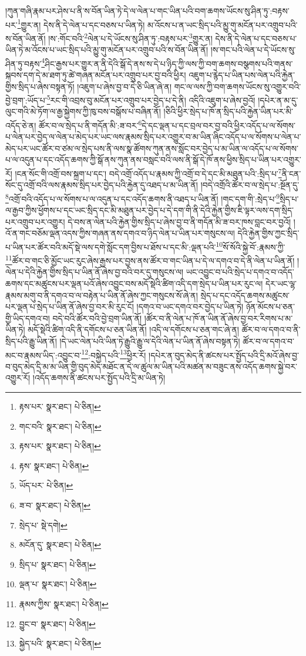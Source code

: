 །ཀུན་གཞི་རྣམ་པར་ཤེས་པ་ནི་ས་བོན་ཡིན་ཏེ་དེ་ལ་ལེན་པ་གང་ཡིན་པའི་བག་ཆགས་ཡོངས་སུ་ཤིན་ཏུ་:བརྟས་པར་\footnote{རྟས་པར་  སྣར་ཐང་།  པེ་ཅིན། }གྱུར་ན། དེས་ནི་དེ་ལེན་པ་དང་བཅས་པ་ཡིན་ཏེ། མ་འོངས་པ་ན་ཡང་སྲིད་པའི་མྱུ་གུ་མངོན་པར་འགྲུབ་པའི་ས་བོན་ཡིན་ནོ། །ས་:གོང་བའི་\footnote{གང་བའི་  སྣར་ཐང་།  པེ་ཅིན། }ལེན་པ་དེ་ཡོངས་སུ་ཤིན་ཏུ་:བརྟས་པར་\footnote{རྟས་པར་  སྣར་ཐང་།  པེ་ཅིན། }གྱུར་ན། དེས་ནི་དེ་ལེན་པ་དང་བཅས་པ་ཡིན་ཏེ་མ་འོངས་པ་ཡང་སྲིད་པའི་མྱུ་གུ་མངོན་པར་འགྲུབ་པའི་ས་བོན་ཡིན་ནོ། །ས་གང་པའི་ལེན་པ་དེ་ཡོངས་སུ་ཤིན་ཏུ་བརྟས་\footnote{རྟས་  སྣར་ཐང་།  པེ་ཅིན། }ཤིང་རྒྱས་པར་གྱུར་ན་ནི་དེའི་སྒོ་དེ་ནས་ས་དེ་པ་ཉིད་ཀྱི་ལས་ཀྱི་བག་ཆགས་བསྩགས་པའི་གནས་སྐབས་དག་དེ་མ་ཐག་ཏུ་ཚེ་གཞན་མངོན་པར་འགྲུབ་པར་བྱ་བའི་ཕྱིར། འཇུག་པ་རྙེད་པ་ཡིན་པས་ལེན་པའི་རྐྱེན་གྱིས་སྲིད་པ་ཞེས་བསྟན་ཏོ། །འཇུག་པ་ཞེས་བྱ་བ་དེ་ཅི་ཡིན་ཞེ་ན། གང་ལ་ལས་ཀྱི་བག་ཆགས་ཡོངས་སུ་འགྱུར་བའི་བྱེ་བྲག་:ཡོད་པ་\footnote{ཡོད་པར་  པེ་ཅིན། }རང་གི་འབྲས་བུ་མངོན་པར་འགྲུབ་པར་བྱེད་པ་དེ་ནི། འདིའི་འཇུག་པ་ཞེས་བྱའོ། །དཔེར་ན་མ་དུ་ལུང་གའི་མེ་ཏོག་ལ་རྒྱ་སྐྱེགས་ཀྱི་ཁུ་བས་བསྒོས་པ་བཞིན་ནོ། །ཅིའི་ཕྱིར་སྲེད་པ་ཁོ་ན་སྲིད་པའི་རྐྱེན་ཡིན་པར་མི་འདོད་ཅེ་ན། ཚོར་བ་ལ་སྲེད་པ་ནི་གདོན་མི་:ཟ་བར་\footnote{ཟ་བ་  སྣར་ཐང་།  པེ་ཅིན། }དེ་དང་ལྡན་པ་དང་བྲལ་བར་བྱ་བའི་ཕྱིར་འདོད་པ་ལ་སོགས་པ་ལེན་པར་བྱེད་ལ་ལེན་པ་མེད་པར་ཡང་ལས་རྣམས་སྲིད་པར་འགྱུར་བ་མ་ཡིན་ཞིང་འདོད་པ་ལ་སོགས་པ་ལེན་པ་མེད་པར་ཡང་ཚོར་བ་ཙམ་ལ་སྲེད་པས་ནི་ལས་སྣ་ཚོགས་ཀུན་ནས་སློང་བར་བྱེད་པ་མ་ཡིན་ལ་འདོད་པ་ལ་སོགས་པ་ལ་འདུན་པ་དང་འདོད་ཆགས་ཀྱི་སྒོ་ནས་ཀུན་ནས་བསླང་བའི་ལས་ནི་སྒོ་དེ་ཁོ་ནས་ཕྱིས་སྲིད་པ་ཡིན་པར་འགྱུར་རོ། །ངན་སོང་གི་འགྲོ་བས་སྐྲག་པ་དང་། བདེ་འགྲོ་འདོད་པ་རྣམས་ཀྱི་འགྲོ་བ་དེ་དང་མི་མཐུན་པའི་:སྲིད་པ་\footnote{སྲེད་པ་  སྡེ་དགེ། }ནི་ངན་སོང་དུ་འགྲོ་བའི་ལས་རྣམས་སྲིད་པར་བྱེད་པའི་རྐྱེན་དུ་འཐད་པ་མ་ཡིན་ནོ། །བདེ་འགྲོའི་ཚོར་བ་ལ་སྲེད་པ་:སྔོན་དུ་\footnote{མངོན་དུ་  སྣར་ཐང་།  པེ་ཅིན། }འགྲོ་བའི་འདོད་པ་ལ་སོགས་པ་ལ་འདུན་པ་དང་འདོད་ཆགས་ནི་འཐད་པ་ཡིན་ནོ། །གང་དག་གི་:སྲེད་པ་\footnote{སྲིད་པ་  སྣར་ཐང་།  པེ་ཅིན། }སྲིད་པ་ལ་རྒྱབ་ཀྱིས་ཕྱོགས་པ་དང་ཡང་སྲིད་དང་མི་མཐུན་པར་བྱེད་པ་དེ་དག་གི་ནི་དེའི་རྐྱེན་གྱིས་ཇི་ལྟར་ལས་དག་སྲིད་པར་འགྲུབ་པར་འགྱུར། དེ་བས་ན་ལེན་པའི་རྐྱེན་གྱིས་སྲིད་པ་ཞེས་བྱ་བ་ནི་གདོན་མི་ཟ་བར་ཁས་བླང་བར་བྱའོ། །འོ་ན་གང་བཅོམ་ལྡན་འདས་ཀྱིས་གཞན་ནས་དགའ་བ་ཉིད་ལེན་པ་ཡིན་པར་གསུངས་ལ། དེའི་རྐྱེན་གྱིས་ཀྱང་སྲིད་པ་ཡིན་པར་ཚོར་བའི་མདོ་སྡེ་ལས་དགེ་སློང་དག་བྱིས་པ་ཐོས་པ་དང་མི་:ལྡན་པའི་\footnote{ལྡན་པ་  སྣར་ཐང་།  པེ་ཅིན། }སོ་སོའི་སྐྱེ་བོ་:རྣམས་ཀྱི་\footnote{རྣམས་ཀྱིས་  སྣར་ཐང་།  པེ་ཅིན། }ཚོར་བ་གང་ཅི་མྱོང་ཡང་རུང་ཞེས་རྒྱས་པར་བྱས་ནས་ཚོར་བ་གང་ཡིན་པ་དེ་ལ་དགའ་བ་དེ་ནི་ལེན་པ་ཡིན་ནོ། །ལེན་པ་དེའི་རྐྱེན་གྱིས་སྲིད་པ་ཡིན་ནོ་ཞེས་བྱ་བའི་བར་དུ་གསུངས་ལ། ཡང་འབྱུང་བ་པའི་སྲེད་པ་དགའ་བ་འདོད་ཆགས་དང་མཚུངས་པར་ལྡན་པའོ་ཞེས་འབྱུང་བས་མདོ་སྡེའི་ཚིག་འདི་དག་སྲེད་པ་ཡིན་པར་རུང་ལ། དེར་ཡང་ལྷ་རྣམས་མགུ་བ་ནི་དགའ་བ་ལ་བརྟེན་པ་ཡིན་ནོ་ཞེས་ཀྱང་གསུངས་སོ་ཞེ་ན། སྲེད་པ་དང་འདོད་ཆགས་མཚུངས་པར་ལྡན་པ་སྲེད་པ་ཡིན་ནོ་ཞེས་བྱ་བར་མི་རུང་ངོ། །དགའ་བ་ཡང་དགའ་བར་བྱེད་པ་ཡིན་ཏེ། ཉོན་མོངས་པ་ཅན་གྱི་ཡིད་དགའ་བ། བདེ་བའི་ཚོར་བའི་བྱེ་བྲག་ཡིན་ནོ། །ཚོར་བ་ནི་ལེན་པ་ཁོ་ན་ཡིན་ནོ་ཞེས་བྱ་བར་རིགས་པ་མ་ཡིན་ཏེ། མདོ་སྡེའི་ཚིག་འདི་ནི་དགོངས་པ་ཅན་ཡིན་ནོ། །འདི་ལ་དགོངས་པ་ཅན་གང་ཞེ་ན། ཚོར་བ་ལ་དགའ་བ་ནི་སྲིད་པའི་རྒྱུ་ཡིན་ནོ། །དེ་ཡང་ལེན་པའི་ཡིན་ཏེ་རྒྱུའི་རྒྱུ་ལ་དེའི་ལེན་པ་ཡིན་ནོ་ཞེས་བསྟན་ཏེ། ཚོར་བ་ལ་དགའ་བ་མང་བ་རྣམས་ཡིད་:འབྱུང་བ་\footnote{བྱུང་བ་  སྣར་ཐང་།  པེ་ཅིན། }:བསྐྱེད་པའི་\footnote{སྐྱེད་པའི་  སྣར་ཐང་།  པེ་ཅིན། }ཕྱིར་རོ། །དཔེར་ན་བུད་མེད་ནི་ཚངས་པར་སྤྱོད་པའི་དྲི་མའོ་ཞེས་བྱ་བ་བུད་མེད་དྲི་མ་མ་ཡིན་གྱི་བུད་མེད་མཐོང་ན་དེ་ལ་ཚུལ་མ་ཡིན་པའི་མཚན་མ་བཟུང་ནས་འདོད་ཆགས་སྐྱེ་བར་འགྱུར་རོ། །འདོད་ཆགས་ནི་ཚངས་པར་སྤྱོད་པའི་དྲི་མ་ཡིན་ཏེ། 